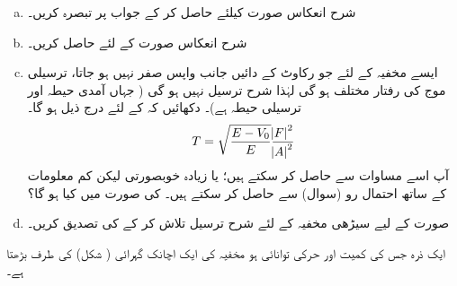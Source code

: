 %
\begin{enumerate}[a.]
\item
  شرح انعکاس      صورت کیلئے  حاصل کر کے  جواب پر تبصرہ کریں۔ 
\item
شرح  انعکاس     صورت کے لئے حاصل  کریں۔ 
\item
ایسے  مخفیہ کے لئے   جو رکاوٹ کے دائیں جانب  واپس صفر  نہیں ہو  جاتا،  ترسیلی موج کی رفتار مختلف ہو گی   لہٰذا    شرح ترسیل  نہیں ہو گی ( جہاں   آمدی حیطہ   اور ترسیلی  حیطہ  ہے)۔ دکھائیں  کہ  کے لئے درج ذیل ہو گا۔
\begin{align}
 T=\sqrt{\frac{E-V_{0}}{E}  }\frac{\abs{F}^{2}}{\abs{A}^{2}} 
 \end{align}
   آپ اسے مساوات سے حاصل کر سکتے ہیں؛  یا زیادہ  خوبصورتی لیکن  کم معلومات کے ساتھ   احتمال رو  (سوال) سے حاصل کر سکتے ہیں۔    کی صورت میں   کیا ہو گا؟
\item

صورت  کے لیے سیڑھی  مخفیہ کے لئے شرح ترسیل تلاش کر کے  کی تصدیق کریں۔
\end{enumerate}
ایک ذرہ جس کی کمیت   اور حرکی توانائی  ہو مخفیہ کی  ایک اچانک گہرائی   ( شکل)  کی طرف بڑھتا ہے۔ 

